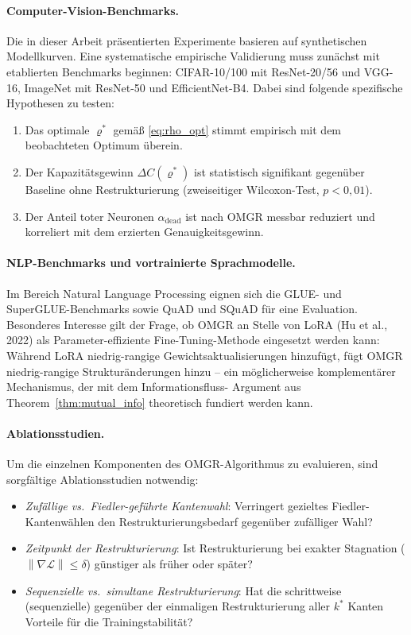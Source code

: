 ﻿\documentclass[12pt, a4paper, openany]{report}
\newcommand{\calL}{\mathcal{L}}
\newcommand{\norms}[1]{\left\|#1\right\|}
\begin{document}
\paragraph{Computer-Vision-Benchmarks.}
Die in dieser Arbeit präsentierten Experimente basieren auf synthetischen
Modellkurven.  Eine systematische empirische Validierung muss zunächst
mit etablierten Benchmarks beginnen: CIFAR-10/100 mit ResNet-20/56 und
VGG-16, ImageNet mit ResNet-50 und EfficientNet-B4.  Dabei sind folgende
spezifische Hypothesen zu testen:
\begin{enumerate}[label=(\roman*)]
  \item Das optimale $\varrho^*$ gemäß \eqref{eq:rho_opt} stimmt
    empirisch mit dem beobachteten Optimum überein.
  \item Der Kapazitätsgewinn $\Delta C(\varrho^*)$ ist statistisch
    signifikant gegenüber Baseline ohne Restrukturierung
    (zweiseitiger Wilcoxon-Test, $p < 0{,}01$).
  \item Der Anteil toter Neuronen $\alpha_{\mathrm{dead}}$ ist nach OMGR
    messbar reduziert und korreliert mit dem erzierten Genauigkeitsgewinn.
\end{enumerate}

\paragraph{NLP-Benchmarks und vortrainierte Sprachmodelle.}
Im Bereich Natural Language Processing eignen sich die GLUE- und
SuperGLUE-Benchmarks sowie QuAD und SQuAD für eine Evaluation.
Besonderes Interesse gilt der Frage, ob OMGR an Stelle von LoRA
(Hu et al., 2022) als Parameter-effiziente Fine-Tuning-Methode
eingesetzt werden kann: Während LoRA niedrig-rangige Gewichtsaktualisierungen
hinzufügt, fügt OMGR niedrig-rangige Strukturänderungen hinzu -- ein
möglicherweise komplementärer Mechanismus, der mit dem Informationsfluss-
Argument aus Theorem~\ref{thm:mutual_info} theoretisch fundiert werden kann.

\paragraph{Ablationsstudien.}
Um die einzelnen Komponenten des OMGR-Algorithmus zu evaluieren, sind
sorgfältige Ablationsstudien notwendig:
\begin{itemize}
  \item \emph{Zufällige vs.\ Fiedler-geführte Kantenwahl}: Verringert
    gezieltes Fiedler-Kantenwählen den Restrukturierungsbedarf gegenüber
    zufälliger Wahl?
  \item \emph{Zeitpunkt der Restrukturierung}: Ist Restrukturierung bei
    exakter Stagnation ($\norms{\nabla\calL} \leq \delta$) günstiger als
    früher oder später?
  \item \emph{Sequenzielle vs.\ simultane Restrukturierung}: Hat die
    schrittweise (sequenzielle) gegenüber der einmaligen Restrukturierung
    aller $k^*$ Kanten Vorteile für die Trainingstabilität?
\end{itemize}
\end{document}
